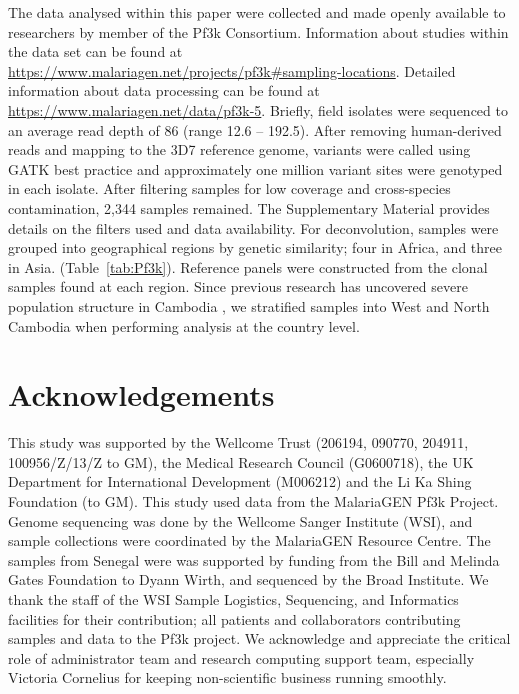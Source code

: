 \documentclass[9pt,lineno]{elife}
\begin{document}
The data analysed within this paper were collected and made openly available to researchers by member of the Pf3k Consortium.  Information about studies within the data set can be found at \url{https://www.malariagen.net/projects/pf3k#sampling-locations}.  Detailed information about data processing can be found at \url{https://www.malariagen.net/data/pf3k-5}.  Briefly, field isolates were sequenced to an average read depth of 86 (range 12.6 -- 192.5).  After removing human-derived reads and mapping to the 3D7 reference genome, variants were called using GATK best practice and approximately one million variant sites were genotyped in each isolate. After filtering samples for low coverage and cross-species contamination, 2,344 samples remained.    The Supplementary Material provides details on the filters used and data availability. For deconvolution, samples were grouped into geographical regions by genetic similarity; four in Africa, and three in Asia. (Table~\ref{tab:Pf3k}). Reference panels were constructed from the clonal samples found at each region. Since previous research has uncovered severe population structure in Cambodia \citep{Miotto2013}, we stratified samples into West and North Cambodia when performing analysis at the country level.



\section{Acknowledgements}
This study was supported by the Wellcome Trust (206194, 090770, 204911, 100956/Z/13/Z to GM), the Medical Research Council (G0600718), the UK Department for International Development (M006212) and the Li Ka Shing Foundation (to GM). This study used data from the MalariaGEN Pf3k Project. Genome sequencing was done by the Wellcome Sanger Institute (WSI), and sample collections were coordinated by the MalariaGEN Resource Centre. The samples from Senegal were was supported by funding from the Bill and Melinda Gates Foundation to Dyann Wirth, and sequenced by the Broad Institute. We thank the staff of the WSI Sample Logistics, Sequencing, and Informatics facilities for their contribution; all patients and collaborators contributing samples and data to the Pf3k project. We acknowledge and appreciate the critical role of administrator team and research computing support team, especially Victoria Cornelius for keeping non-scientific business running smoothly.
\end{document}
